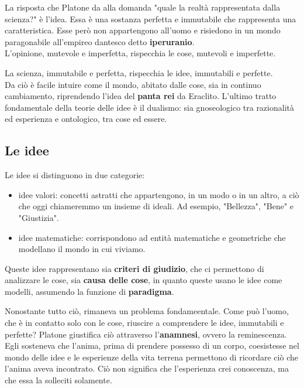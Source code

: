 \documentclass[10pt,a4paper]{article}
\begin{document}
	 La risposta che Platone da alla domanda "quale la realtà rappresentata dalla scienza?" è l'idea. Essa è una sostanza perfetta e immutabile che rappresenta una caratteristica. Esse però non appartengono all'uomo e risiedono in un mondo paragonabile all'empireo dantesco detto \textbf{iperuranio}.\\

	 L'opinione, mutevole e imperfetta, rispecchia le cose, mutevoli e imperfette.

	 La scienza, immutabile e perfetta, rispecchia le idee, immutabili e perfette.\\

	 Da ciò è facile intuire come il mondo, abitato dalle cose, sia in continuo cambiamento, riprendendo l'idea del \textbf{panta rei} da Eraclito. L'ultimo tratto fondamentale della teorie delle idee è il dualismo: sia gnoseologico tra razionalità ed esperienza e ontologico, tra cose ed essere.

	 \subsection{Le idee}

	 Le idee si distinguono in due categorie:
	 \begin{itemize}
	 	\item idee valori: concetti astratti che appartengono, in un modo o in un altro, a ciò che oggi chiameremmo un insieme di ideali. Ad esempio, "Bellezza", "Bene"  e "Giustizia".
		\item idee matematiche: corrispondono ad entità matematiche e geometriche che modellano il mondo in cui viviamo.
	 \end{itemize}

	 Queste idee rappresentano sia \textbf{criteri di giudizio}, che ci permettono di analizzare le cose, sia \textbf{causa delle cose}, in quanto queste usano le idee come modelli, assumendo la funzione di \textbf{paradigma}.

	 Nonostante tutto ciò, rimaneva un problema fondameentale. Come può l'uomo, che è in contatto solo con le cose, riuscire a comprendere le idee, immutabili e perfette? Platone giustifica ciò attraverso l'\textbf{anamnesi}, ovvero la reminescenza. Egli sosteneva che l'anima, prima di prendere possesso di un corpo, coesistesse nel mondo delle idee e le esperienze della vita terrena permettono di ricordare ciò che l'anima aveva incontrato. Ciò non significa che l'esperienza crei conoscenza, ma che essa la solleciti solamente.
\end{document}
